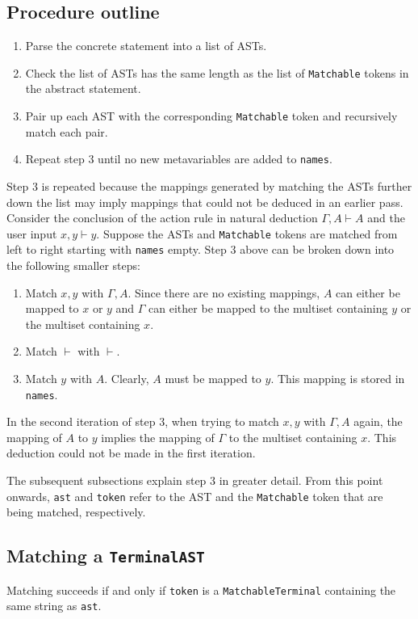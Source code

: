 \subsection{Procedure outline}
\label{matching:procedure}
\begin{enumerate}
    \item Parse the concrete statement into a list of ASTs.
    \item Check the list of ASTs has the same length as the list of \lstinline{Matchable} tokens in the abstract statement.
    \item Pair up each AST with the corresponding \lstinline{Matchable} token and recursively match each pair.
    \item Repeat step 3 until no new metavariables are added to \lstinline{names}.
\end{enumerate}
Step 3 is repeated because the mappings generated by matching the ASTs further down the list may imply mappings that could not be deduced in an earlier pass. Consider the conclusion of the action rule in natural deduction $\Gamma, A \vdash A$ and the user input $x, y \vdash y$. Suppose the ASTs and \lstinline{Matchable} tokens are matched from left to right starting with \lstinline{names} empty. Step 3 above can be broken down into the following smaller steps:
\begin{enumerate}
    \item Match $x, y$ with $\Gamma, A$. Since there are no existing mappings, $A$ can either be mapped to $x$ or $y$ and $\Gamma$ can either be mapped to the multiset containing $y$ or the multiset containing $x$.
    \item Match $\vdash$ with $\vdash$.
    \item Match $y$ with $A$. Clearly, $A$ must be mapped to $y$. This mapping is stored in \lstinline{names}.
\end{enumerate}
In the second iteration of step 3, when trying to match $x, y$ with $\Gamma, A$ again, the mapping of $A$ to $y$ implies the mapping of $\Gamma$ to the multiset containing $x$. This deduction could not be made in the first iteration.

The subsequent subsections explain step 3 in greater detail. From this point onwards, \lstinline{ast} and \lstinline{token} refer to the AST and the \lstinline{Matchable} token that are being matched, respectively.

\subsection{Matching a \texorpdfstring{\lstinline{TerminalAST}}{TerminalAST}}
Matching succeeds if and only if \lstinline{token} is a \lstinline{MatchableTerminal} containing the same string as \lstinline{ast}.

